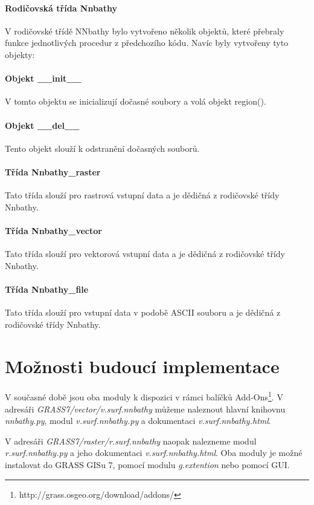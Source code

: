 \documentclass[12pt,a4paper]{article}
\begin{document}
\paragraph{Rodičovská třída Nnbathy} V rodičovské třídě NNbathy bylo vytvořeno několik objektů, které přebraly funkce jednotlivých procedur z předchozího kódu. Navíc byly vytvořeny tyto objekty:

\paragraph{Objekt \_\_init\_\_}
V tomto objektu se inicializují dočasné soubory a volá objekt region().

\paragraph{Objekt \_\_del\_\_}
Tento objekt slouží k odstranění dočasných souborů.

\paragraph{Třída Nnbathy\_raster}
Tato třída slouží pro rastrová vstupní data a je dědičná z rodičovské třídy Nnbathy.

\paragraph{Třída Nnbathy\_vector}
Tato třída slouží pro vektorová vstupní data a je dědičná z rodičovské třídy Nnbathy.

\paragraph{Třída Nnbathy\_file}
Tato třída slouží pro vstupní data v podobě ASCII souboru a je dědičná z rodičovské třídy Nnbathy.

\newpage
\section{Možnosti budoucí implementace}
V současné době jsou oba moduly k dispozici v rámci balíčků Add-Ons\footnote{http://grass.osgeo.org/download/addons/}. V adresáři \emph{GRASS7/vector/v.surf.nnbathy} můžeme  naleznout hlavní knihovnu \emph{nnbathy.py}, modul \emph{v.surf.nnbathy.py} a dokumentaci \emph{v.surf.nnbathy.html}. 

V adresáři \emph{GRASS7/raster/r.surf.nnbathy} naopak nalezneme modul \emph{r.surf.nnbathy.py} a jeho dokumentaci \emph{v.surf.nnbathy.html}. Oba moduly je možné instalovat do GRASS GISu 7, pomocí modulu \emph{g.extention} nebo pomocí GUI.
\end{document}
